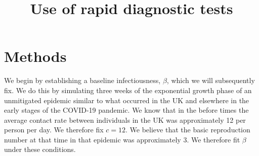 \documentclass{amsart}
\title{Use of rapid diagnostic tests}
\begin{document}
\section{Methods}

We begin by establishing a baseline infectiousness, $\beta$, which we will
subsequently fix. We do this by simulating three weeks of the exponential growth
phase of an unmitigated epidemic similar to what occurred in the UK and
elsewhere in the early stages of the COVID-19 pandemic. We know that in the
before times the average contact rate between individuals in the UK was
approximately 12 per person per day. We therefore fix $c = 12$. We believe that
the basic reproduction number at that time in that epidemic was approximately 3.
We therefore fit $\beta$ under these conditions.
\end{document}
